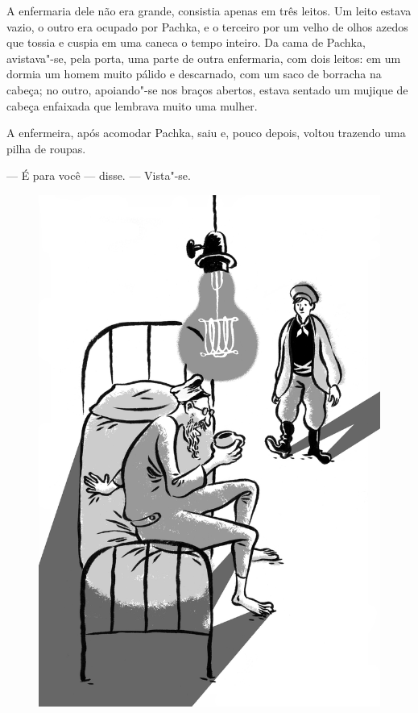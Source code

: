 A enfermaria dele não era grande, consistia apenas em três leitos. Um
leito estava vazio, o outro era ocupado por Pachka, e o terceiro por um
velho de olhos azedos que tossia e cuspia em uma caneca o tempo inteiro.
Da cama de Pachka, avistava"-se, pela porta, uma parte de outra
enfermaria, com dois leitos: em um dormia um homem muito pálido e
descarnado, com um saco de borracha na cabeça; no outro, apoiando"-se nos
braços abertos, estava sentado um mujique de cabeça enfaixada que
lembrava muito uma mulher.

A enfermeira, após acomodar Pachka, saiu e, pouco depois, voltou
trazendo uma pilha de roupas.

--- É para você --- disse. --- Vista"-se.

\begin{figure}%
\vspace*{-1.6cm}
\hspace*{-2cm}\includegraphics[width=140mm]{./imgs/cena7.jpg}
\end{figure}


